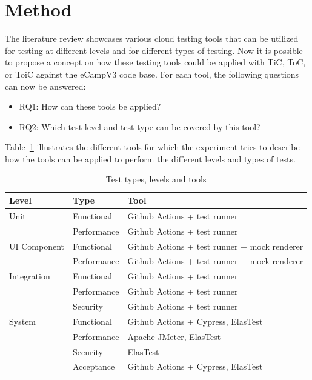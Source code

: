 \documentclass[conference]{IEEEtran}
\begin{document}
\section{Method}
The literature review showcases various cloud testing tools that can be utilized for testing at different levels and for different types of testing.
Now it is possible to propose a concept on how these testing tools could be applied with TiC, ToC, or ToiC against the eCampV3 code base\cite{bertolino2019systematic}.
For each tool, the following questions can now be answered:
\begin{itemize}
	\item RQ1: How can these tools be applied?
	\item RQ2: Which test level and test type can be covered by this tool?
\end{itemize}
Table~\ref{tab:test-levels-and-tools} illustrates the different tools for which the experiment tries to describe
how the tools can be applied to perform the different levels and types of tests.

\begin{table}[t]
	\centering
	\begin{tabular}{| l | l | l |}
		\toprule
		\textbf{Level} & \textbf{Type} & \textbf{Tool}                                \\
		\midrule
		Unit           & Functional    & Github Actions + test runner                 \\
		               & Performance   & Github Actions + test runner                 \\
		\midrule
		UI Component   & Functional    & Github Actions + test runner + mock renderer \\
		               & Performance   & Github Actions + test runner + mock renderer \\
		\midrule
		Integration    & Functional    & Github Actions + test runner                 \\
		               & Performance   & Github Actions + test runner                 \\
		               & Security      & Github Actions + test runner                 \\
		\midrule
		System         & Functional    & Github Actions + Cypress, ElasTest           \\
		               & Performance   & Apache JMeter, ElasTest                      \\
		               & Security      & ElasTest                                     \\
		               & Acceptance    & Github Actions + Cypress, ElasTest           \\
		\midrule
	\end{tabular}
	\caption{Test types, levels and tools}
	\label{tab:test-levels-and-tools}
\end{table}
\end{document}
